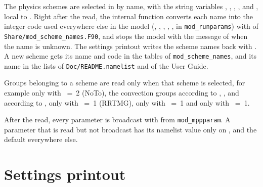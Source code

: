 The physics schemes are selected in  by name, with the
string variables , ,
, ,  and
, local to . Right after the read,
the internal function  converts each name into the
integer code used everywhere else in the model (,
, , , ,
 in \verb=mod_runparams=) with  of
\verb=Share/mod_scheme_names.F90=, and stops the model with the message of
 when the name is unknown. The settings printout writes
the scheme names back with . A new scheme gets its name
and code in the tables of \verb=mod_scheme_names=, and its name in the
lists of \verb=Doc/README.namelist= and of the User Guide.

Groups belonging to a scheme are read only when that scheme is selected,
for example  only with ~=~2 (NoTo), the
convection groups according to , ,
 and  according to ,
 only with ~=~1 (RRTMG), 
only with ~=~1 and  only with
~=~1.

After the read, every parameter is broadcast with 
from \verb=mod_mppparam=. A parameter that is read but not broadcast has
its namelist value only on , and the default everywhere else.

\section{Settings printout}

